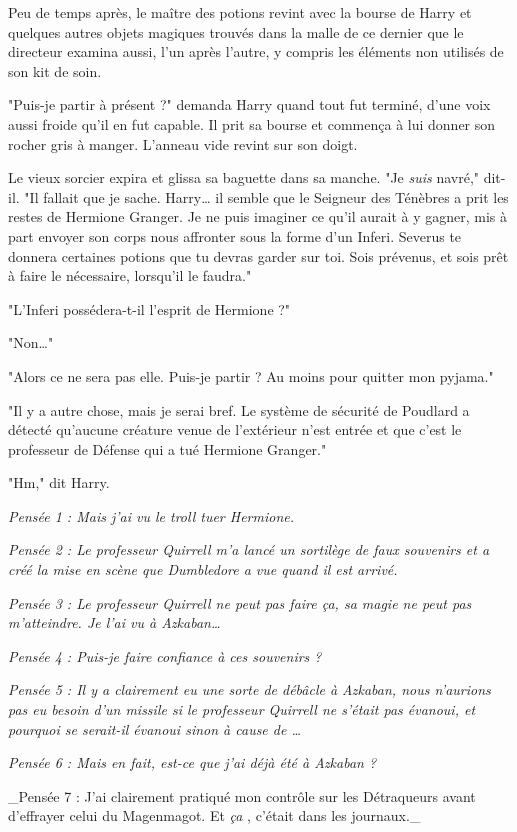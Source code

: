 Peu de temps après, le maître des potions revint avec la bourse de Harry et quelques autres objets magiques trouvés dans la malle de ce dernier que le directeur examina aussi, l'un après l'autre, y compris les éléments non utilisés de son kit de soin.

"Puis-je partir à présent ?" demanda Harry quand tout fut terminé, d'une voix aussi froide qu'il en fut capable. Il prit sa bourse et commença à lui donner son rocher gris à manger. L'anneau vide revint sur son doigt.

Le vieux sorcier expira et glissa sa baguette dans sa manche. "Je \emph{suis}  navré," dit-il. "Il fallait que je sache. Harry… il semble que le Seigneur des Ténèbres a prit les restes de Hermione Granger. Je ne puis imaginer ce qu'il aurait à y gagner, mis à part envoyer son corps nous affronter sous la forme d'un Inferi. Severus te donnera certaines potions que tu devras garder sur toi. Sois prévenus, et sois prêt à faire le nécessaire, lorsqu'il le faudra."

"L'Inferi possédera-t-il l'esprit de Hermione ?"

"Non…"

"Alors ce ne sera pas elle. Puis-je partir ? Au moins pour quitter mon pyjama."

"Il y a autre chose, mais je serai bref. Le système de sécurité de Poudlard a détecté qu'aucune créature venue de l'extérieur n'est entrée et que c'est le professeur de Défense qui a tué Hermione Granger."

"Hm," dit Harry.

\emph{Pensée 1 : Mais j'ai vu le troll tuer Hermione.} 

\emph{Pensée 2 : Le professeur Quirrell m'a lancé un sortilège de faux souvenirs et a créé la mise en scène que Dumbledore a vue quand il est arrivé.} 

\emph{Pensée 3 : Le professeur Quirrell ne peut pas faire ça, sa magie ne peut pas m'atteindre. Je l'ai vu à Azkaban…} 

\emph{Pensée 4 : Puis-je faire confiance à ces souvenirs ?} 

\emph{Pensée 5 : Il y a clairement eu une sorte de débâcle à Azkaban, nous n'aurions pas eu besoin d'un missile si le professeur Quirrell ne s'était pas évanoui, et pourquoi se serait-il évanoui sinon à cause de …} 

\emph{Pensée 6 : Mais en fait, est-ce que j'ai déjà été à Azkaban ?} 

\_Pensée 7 : J'ai clairement pratiqué mon contrôle sur les Détraqueurs avant d'effrayer celui du Magenmagot. Et \emph{ça} , c'était dans les journaux.\_

